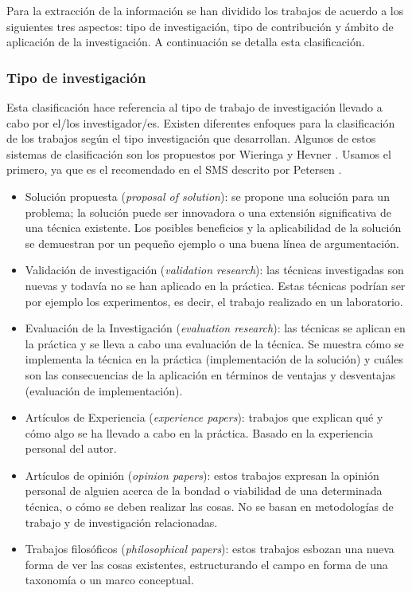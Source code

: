 Para la extracción de la información se han dividido los trabajos de acuerdo a los siguientes tres aspectos: tipo de investigación, tipo de contribución y ámbito de aplicación de la investigación. A continuación se detalla esta clasificación.

\subsubsection{Tipo de investigación}
Esta clasificación hace referencia al tipo de trabajo de investigación llevado a cabo por el/los investigador/es. Existen diferentes enfoques para la clasificación de los trabajos según el tipo investigación que desarrollan. Algunos de estos sistemas de clasificación son los propuestos por Wieringa \cite{Wieringa:2005} y Hevner \cite{Hevner:2004}. Usamos el primero, ya que es el recomendado en el SMS descrito por Petersen \cite{Petersen:2008}.
\begin{itemize}
\item Solución propuesta (\emph{proposal of solution}): se propone una solución para un problema; la solución puede ser innovadora o una extensión significativa de una técnica existente. Los posibles beneficios y la aplicabilidad de la solución se demuestran por un pequeño ejemplo o una buena línea de argumentación.
\item Validación de investigación (\emph{validation research}): las técnicas investigadas son nuevas y todavía no se han aplicado en la práctica. Estas técnicas podrían ser por ejemplo los experimentos, es decir, el trabajo realizado en un laboratorio.
\item Evaluación de la Investigación (\emph{evaluation research}): las técnicas se aplican en la práctica y se lleva a cabo una evaluación de la técnica. Se muestra cómo se implementa la técnica en la práctica (implementación de la solución) y cuáles son las consecuencias de la aplicación en términos de ventajas y desventajas (evaluación de implementación).
\item Artículos de Experiencia (\emph{experience papers}): trabajos que explican qué y cómo algo se ha llevado a cabo en la práctica. Basado en la experiencia personal del autor.
\item Artículos de opinión (\emph{opinion papers}): estos trabajos expresan la opinión personal de alguien acerca de la bondad o viabilidad de una determinada técnica, o cómo se deben realizar las cosas. No se basan en metodologías de trabajo y de investigación relacionadas.
\item Trabajos filosóficos (\emph{philosophical papers}): estos trabajos esbozan una nueva forma de ver las cosas existentes, estructurando el campo en forma de una taxonomía o un marco conceptual.
\end{itemize}

